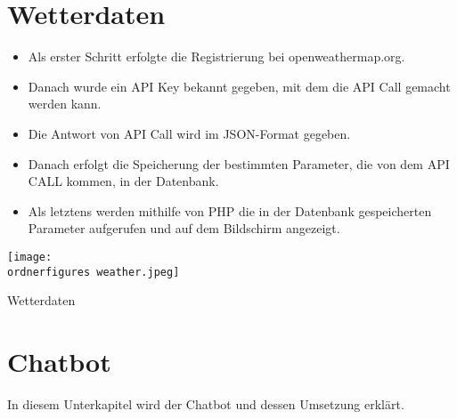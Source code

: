 \section{Wetterdaten}
\begin{itemize}
	\item Als erster Schritt erfolgte die Registrierung bei openweathermap.org. 
\end{itemize}
\begin{itemize}
	\item 	Danach wurde ein API Key bekannt gegeben, mit dem die API Call gemacht werden kann.
\end{itemize}
\begin{itemize}
	\item Die Antwort von API Call wird im JSON-Format gegeben.
\end{itemize}
\begin{itemize}
	\item Danach erfolgt die Speicherung der bestimmten Parameter, die von dem API CALL kommen, in der Datenbank.
\end{itemize}
\begin{itemize}
	\item Als letztens werden mithilfe von PHP die in der Datenbank gespeicherten Parameter aufgerufen und auf dem Bildschirm angezeigt.
\end{itemize}	
\captionsetup{type=figure}
\texttt{[image: \\ordnerfigures weather.jpeg]}
\caption{Wetterdaten}
\label{Wetter} 
\captionsetup{type=figure} 
\section{Chatbot}
In diesem Unterkapitel wird der Chatbot und dessen Umsetzung erklärt.
